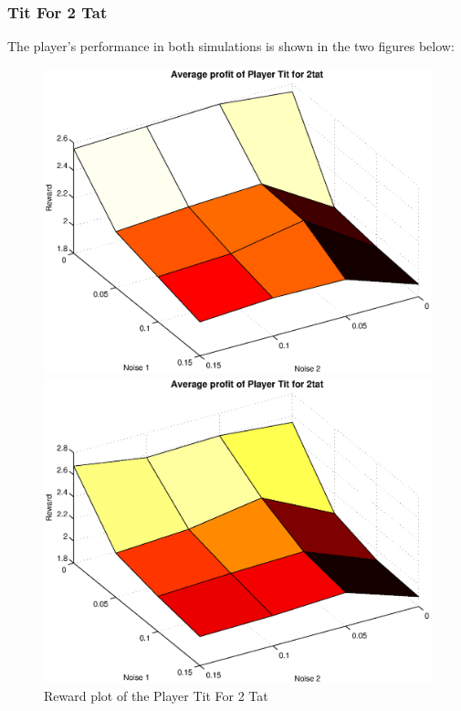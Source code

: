 \subsubsection{Tit For 2 Tat}
The player's performance in both simulations is shown in the two figures below:
\begin{figure}[h]

\begin{minipage}[hbt]{0.65\textwidth}
	\centering
	\includegraphics[width=\textwidth]{pics/simulation1/Reward_vs_Noise_of_Player_Tit_for_2tat}
\end{minipage}
\hfill
\begin{minipage}[hbt]{0.3\textwidth}
	\centering
	\includegraphics[width=\textwidth]{pics/simulation2/Reward_vs_Noise_of_Player_Tit_for_2tat}
\end{minipage}
	\caption{Reward plot of the Player Tit For 2 Tat}
	\label{pic player tf2t}
\end{figure}

